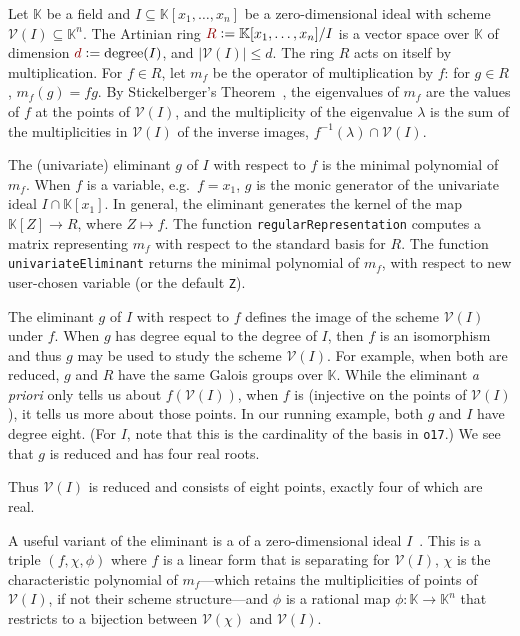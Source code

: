 \documentclass[12pt]{amsart}
\theoremstyle{definition}
\newcommand{\KK}{\mathbb{K}}
\newcommand{\calV}{\mathcal{V}}
\newcommand{\defcolor}[1]{{\color{TAMU}#1}}
\newcommand{\demph}[1]{\defcolor{{\sl #1}}}
\begin{document}
Let  $\KK$ be a field and $I\subseteq\KK[x_1,\dotsc,x_n]$ be a zero-dimension\-al ideal  with scheme $\calV(I)\subseteq\KK^n$.
The Artinian ring $\defcolor{R}\vcentcolon=\KK[x_1,\dotsc,x_n]/I$ is a vector space over $\KK$ of dimension
$\defcolor{d}\vcentcolon=\mbox{degree}(I)$, and $|\calV(I)|\leq d$.
The ring $R$ acts on itself by multiplication.
For $f\in R$, let \defcolor{$m_f$} be the operator of multiplication by $f$: for $g\in R$, $m_f(g)=fg$.
By Stickelberger's Theorem~\cite{Cox2021}, the eigenvalues of $m_f$ are the values of $f$ at the  points of $\calV(I)$,
and the multiplicity of the eigenvalue $\lambda$ is the sum of the multiplicities in $\calV(I)$ of the inverse images,
$f^{-1}(\lambda)\cap\calV(I)$. 


The (univariate) \defcolor{eliminant} \defcolor{$g$} of $I$ with respect to $f$ is the minimal polynomial of $m_f$.
When $f$ is a variable, e.g.\ $f=x_1$, $g$ is the monic generator of the univariate ideal $I\cap\KK[x_1]$.
In general, the eliminant generates the kernel of the map $\KK[Z]\to R$, where $Z\mapsto f$.
The function \texttt{regularRepresentation} computes a matrix representing $m_f$ with respect to the standard basis for $R$.
The function \texttt{univariateEliminant} returns the minimal polynomial of $m_f$, with respect to new user-chosen variable
(or the default \texttt{Z}). 
%
\begin{leftbar}

\end{leftbar}
%
The eliminant \defcolor{$g$} of $I$ with respect to $f$ defines the image of the scheme $\calV(I)$ under $f$.
When $g$ has degree equal to the degree of $I$, then $f$ is an isomorphism and thus $g$ may be used to study the scheme
$\calV(I)$.
For example, when both are reduced, $g$ and $R$ have the same Galois groups over $\KK$.
While the eliminant {\it a priori} only tells us about $f(\calV(I))$, when $f$ is \demph{separating} (injective on the
points of $\calV(I)$), it tells us more about those points.
In our running example, both $g$ and $I$ have degree eight. (For $I$, note that this is the cardinality of the basis in \texttt{o17}.)
We see that $g$ is reduced and has four real roots.
%
\begin{leftbar}

\end{leftbar}
%
Thus $\calV(I)$ is reduced and consists of eight points, exactly four of which are real.

A useful variant of the eliminant is a \demph{rational univariate representation} of a zero-dimension\-al ideal $I$~\cite[Sect.\ 11.4]{BPR}.
This is a triple \defcolor{$(f,\chi,\phi)$} where $f$ is a linear form that is separating for $\calV(I)$, $\chi$ is the characteristic
polynomial of $m_f$---which retains the multiplicities of points of $\calV(I)$, if not their scheme structure---and $\phi$
is a rational map $\phi\colon\KK\to\KK^n$ that restricts to a bijection between $\calV(\chi)$ and $\calV(I)$.
%
\begin{leftbar}

\end{leftbar}
%
\end{document}
